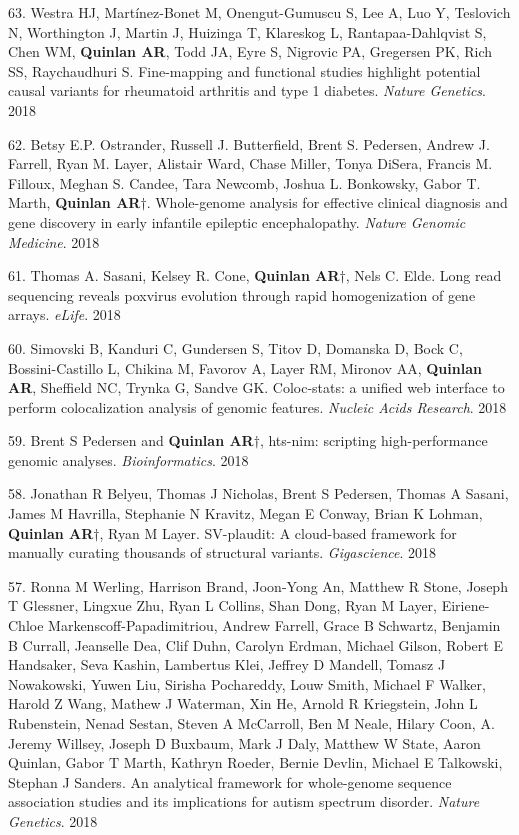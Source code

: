 \documentclass[margin,line]{cv}
\begin{document}
\begin{resume}
\begin{list}{*}{}
    \item[63.] Westra HJ, Martínez-Bonet M, Onengut-Gumuscu S, Lee A, Luo Y, Teslovich N, Worthington J, Martin J, Huizinga T, Klareskog L, Rantapaa-Dahlqvist S, Chen WM, \textbf{Quinlan AR}, Todd JA, Eyre S, Nigrovic PA, Gregersen PK, Rich SS, Raychaudhuri S. Fine-mapping and functional studies highlight potential causal variants for rheumatoid arthritis and type 1 diabetes. \emph{Nature Genetics}. 2018

    \item[62.] Betsy E.P. Ostrander, Russell J. Butterfield, Brent S. Pedersen, Andrew J. Farrell, Ryan M. Layer, Alistair Ward, Chase Miller, Tonya DiSera, Francis M. Filloux, Meghan S. Candee, Tara Newcomb, Joshua L. Bonkowsky, Gabor T. Marth, \textbf{Quinlan AR}$\dagger$. Whole-genome analysis for effective clinical diagnosis and gene discovery in early infantile epileptic encephalopathy. \emph{Nature Genomic Medicine}. 2018

    \item[61.] Thomas A. Sasani, Kelsey R. Cone, \textbf{Quinlan AR}$\dagger$, Nels C. Elde. Long read sequencing reveals poxvirus evolution through rapid homogenization of gene arrays. \emph{eLife}. 2018

    \item[60.] Simovski B, Kanduri C, Gundersen S, Titov D, Domanska D, Bock C, Bossini-Castillo L, Chikina M, Favorov A, Layer RM, Mironov AA, \textbf{Quinlan AR}, Sheffield NC, Trynka G, Sandve GK. Coloc-stats: a unified web interface to perform colocalization analysis of genomic features. \emph{Nucleic Acids Research}. 2018 

    \item[59.] Brent S Pedersen and \textbf{Quinlan AR}$\dagger$, hts-nim: scripting high-performance genomic analyses. \emph{Bioinformatics}. 2018

    \item[58.] Jonathan R Belyeu, Thomas J Nicholas, Brent S Pedersen, Thomas A Sasani, James M Havrilla, Stephanie N Kravitz, Megan E Conway, Brian K Lohman, \textbf{Quinlan AR}$\dagger$, Ryan M Layer. SV-plaudit: A cloud-based framework for manually curating thousands of structural variants. \emph{Gigascience}. 2018

    \item[57.] Ronna M Werling, Harrison Brand, Joon-Yong An, Matthew R Stone, Joseph T Glessner, Lingxue Zhu, Ryan L Collins, Shan Dong, Ryan M Layer, Eiriene-Chloe Markenscoff-Papadimitriou, Andrew Farrell, Grace B Schwartz, Benjamin B Currall, Jeanselle Dea, Clif Duhn, Carolyn Erdman, Michael Gilson, Robert E Handsaker, Seva Kashin, Lambertus Klei, Jeffrey D Mandell, Tomasz J Nowakowski, Yuwen Liu, Sirisha Pochareddy, Louw Smith, Michael F Walker, Harold Z Wang, Mathew J Waterman, Xin He, Arnold R Kriegstein, John L Rubenstein, Nenad Sestan, Steven A McCarroll, Ben M Neale, Hilary Coon, A. Jeremy Willsey, Joseph D Buxbaum, Mark J Daly, Matthew W State, Aaron Quinlan, Gabor T Marth, Kathryn Roeder, Bernie Devlin, Michael E Talkowski, Stephan J Sanders.
    An analytical framework for whole-genome sequence association studies and its implications for autism spectrum disorder. \emph{Nature Genetics}. 2018


\end{list}
\end{resume}
\end{document}

